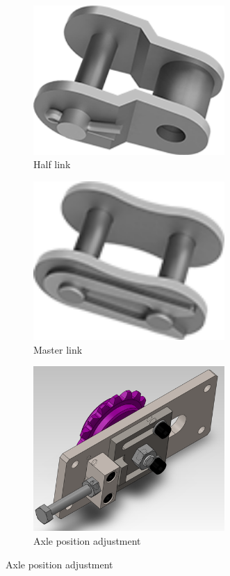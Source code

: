 \begin{figure}[H]
	\begin{subfigure}[b]{.32\linewidth}
		\includegraphics[width=0.8\textwidth]{imgs/chain_halflink.png}
		\caption{Half link}
	\end{subfigure}\begin{subfigure}[b]{.32\linewidth}
		\includegraphics[width=0.8\textwidth]{imgs/chain_masterlink.png}
		\caption{Master link}
	\end{subfigure}\begin{subfigure}[b]{.32\linewidth}
		\includegraphics[width=0.8\textwidth]{imgs/chain_axletens.png}
		\caption{Axle position adjustment}
	\end{subfigure}
	

\end{figure}
